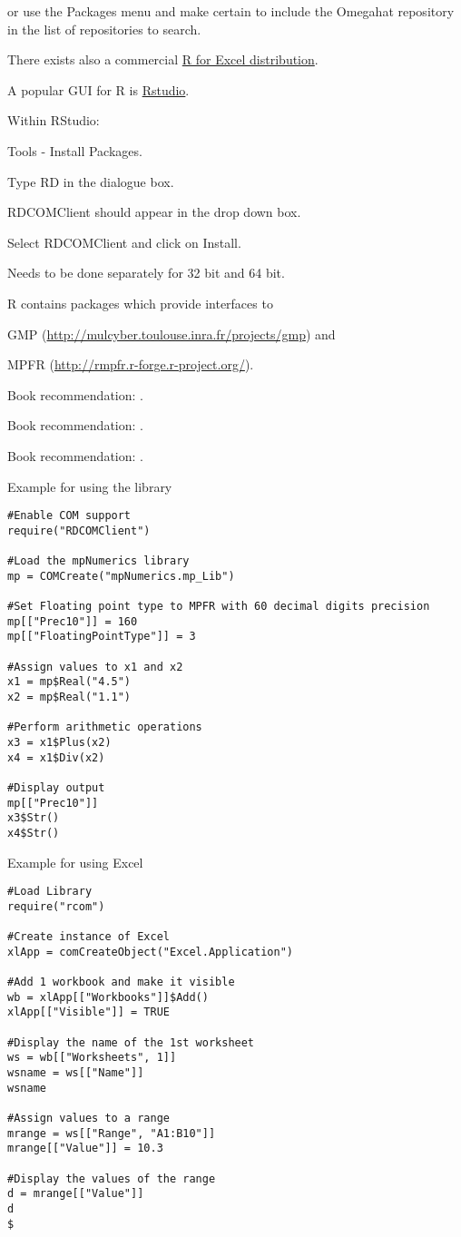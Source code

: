 or use the Packages menu and make certain to include the Omegahat repository in the list of repositories to search. 

There exists also a commercial \href{http://rcom.univie.ac.at/main.html}{R for Excel distribution}.

\vpara
A popular GUI for R is \href{http://www.rstudio.com/}{Rstudio}.

Within RStudio:

Tools - Install Packages.

Type RD in the dialogue box.

RDCOMClient should appear in the drop down box.

Select RDCOMClient and click on Install.

Needs to be done separately for 32 bit and 64 bit.

\vpara
R contains packages which provide interfaces to 

GMP (\href{http://mulcyber.toulouse.inra.fr/projects/gmp}{http://mulcyber.toulouse.inra.fr/projects/gmp}) and 

MPFR (\href{http://rmpfr.r-forge.r-project.org/}{http://rmpfr.r-forge.r-project.org/}). 

\vpara
Book recommendation: \cite{Adler2012}.

Book recommendation: \cite{Verzani2011}.

Book recommendation: \cite{Chang2012}.

\vpara
Example for using the library

\begin{lstlisting}
#Enable COM support
require("RDCOMClient")

#Load the mpNumerics library
mp = COMCreate("mpNumerics.mp_Lib")

#Set Floating point type to MPFR with 60 decimal digits precision
mp[["Prec10"]] = 160
mp[["FloatingPointType"]] = 3

#Assign values to x1 and x2
x1 = mp$Real("4.5")
x2 = mp$Real("1.1")

#Perform arithmetic operations
x3 = x1$Plus(x2)
x4 = x1$Div(x2)

#Display output
mp[["Prec10"]]
x3$Str()
x4$Str()
\end{lstlisting}

\vpara
Example for using Excel

\begin{lstlisting}
#Load Library
require("rcom")

#Create instance of Excel
xlApp = comCreateObject("Excel.Application")

#Add 1 workbook and make it visible
wb = xlApp[["Workbooks"]]$Add()
xlApp[["Visible"]] = TRUE

#Display the name of the 1st worksheet
ws = wb[["Worksheets", 1]]
wsname = ws[["Name"]]
wsname

#Assign values to a range
mrange = ws[["Range", "A1:B10"]]
mrange[["Value"]] = 10.3

#Display the values of the range
d = mrange[["Value"]]
d
$
\end{lstlisting}

